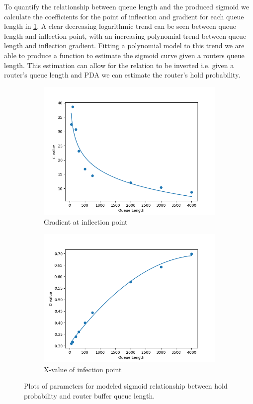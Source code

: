     To quantify the relationship between queue length and the produced sigmoid we calculate the coefficients for the point of inflection and gradient for each queue length in \cref{fig:Rsigmoidcoefs}. A clear decreasing logarithmic trend can be seen between queue length and inflection point, with an increasing polynomial trend between queue length and inflection gradient. Fitting a polynomial model to this trend we are able to produce a function to estimate the sigmoid curve given a routers queue length. This estimation can allow for the relation to be inverted i.e. given a router's queue length and PDA we can estimate the router's hold probability.
    \begin{figure}[H]
        \centering
        \begin{subfigure}{0.475\textwidth}
            \includegraphics[width=\textwidth]{figs/results/qlen_param_c.png}
            \caption{Gradient at inflection point}
        \end{subfigure}
        \begin{subfigure}{0.475\textwidth}
            \includegraphics[width=\textwidth]{figs/results/qlen_param_d.png}
            \caption{X-value of infection point}
        \end{subfigure}
        \caption{Plots of parameters for modeled sigmoid relationship between hold probability and router buffer queue length.}
        \label{fig:Rsigmoidcoefs}
    \end{figure}